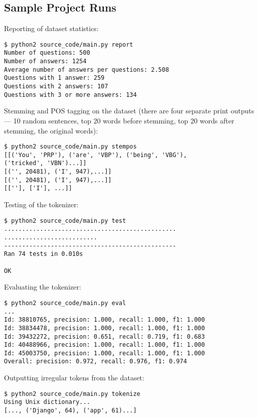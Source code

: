 \subsection*{Sample Project Runs}

Reporting of dataset statistics:

\begin{lstlisting}
$ python2 source_code/main.py report
Number of questions: 500
Number of answers: 1254
Average number of answers per questions: 2.508
Questions with 1 answer: 259
Questions with 2 answers: 107
Questions with 3 or more answers: 134
\end{lstlisting}

Stemming and POS tagging on the dataset (there are four separate print outputs
--- 10 random sentences, top 20 words before stemming, top 20 words after
stemming, the original words):

\begin{lstlisting}
$ python2 source_code/main.py stempos
[[('You', 'PRP'), ('are', 'VBP'), ('being', 'VBG'),
('tricked', 'VBN')...]]
[('', 20481), ('I', 947),...]]
[('', 20481), ('I', 947),...]]
[[''], ['I'], ...]]
\end{lstlisting}

Testing of the tokenizer:

\begin{lstlisting}
$ python2 source_code/main.py test
................................................
..........................
------------------------------------------------
Ran 74 tests in 0.010s

OK
\end{lstlisting}

Evaluating the tokenizer:

\begin{lstlisting}
$ python2 source_code/main.py eval
...
Id: 38810765, precision: 1.000, recall: 1.000, f1: 1.000
Id: 38834478, precision: 1.000, recall: 1.000, f1: 1.000
Id: 39432272, precision: 0.651, recall: 0.719, f1: 0.683
Id: 40488966, precision: 1.000, recall: 1.000, f1: 1.000
Id: 45003750, precision: 1.000, recall: 1.000, f1: 1.000
Overall: precision: 0.972, recall: 0.976, f1: 0.974
\end{lstlisting}

Outputting irregular tokens from the dataset:

\begin{lstlisting}
$ python2 source_code/main.py tokenize
Using Unix dictionary...
[..., ('Django', 64), ('app', 61)...]
\end{lstlisting}

